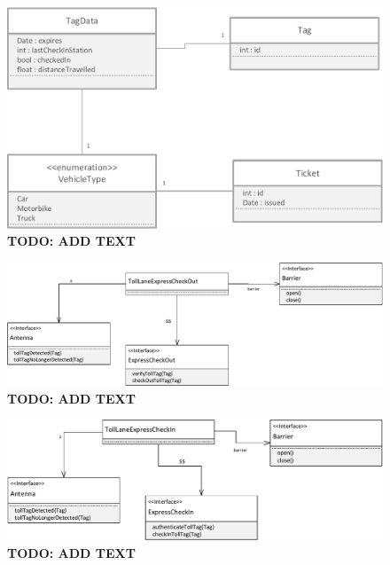 \begin{figure}
\centerline{\includegraphics[width=\textwidth]{img/class_diagrams/class_diagram_Tag_Ticket_VehicleType}}
\caption{\textbf{TODO: ADD TEXT}}
\label{fig:cld_ttvt}
\end{figure}

\begin{figure}
\centerline{\includegraphics[width=\textwidth]{img/class_diagrams/class_diagram_toll_lane_express_check_in}}
\caption{\textbf{TODO: ADD TEXT}}
\label{fig:cld_tlei}
\end{figure}

\begin{figure}
\centerline{\includegraphics[width=\textwidth]{img/class_diagrams/class_diagram_toll_lane_express_check_out}}
\caption{\textbf{TODO: ADD TEXT}}
\label{fig:cld_tleo}
\end{figure}

